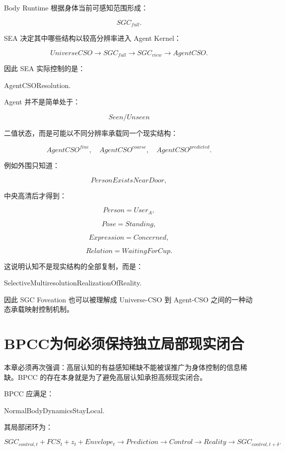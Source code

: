Body Runtime 根据身体当前可感知范围形成：

\[
SGC_{full}.
\]

SEA 决定其中哪些结构以较高分辨率进入 Agent Kernel：

\[
UniverseCSO
\rightarrow
SGC_{full}
\rightarrow
SGC_{view}
\rightarrow
AgentCSO.
\]

因此 SEA 实际控制的是：

\begin{statementbox}
AgentCSOResolution.
\end{statementbox}

Agent 并不是简单处于：

\[
Seen/Unseen
\]

二值状态，而是可能以不同分辨率承载同一个现实结构：

\[
AgentCSO^{fine},
\quad
AgentCSO^{coarse},
\quad
AgentCSO^{predicted}.
\]

例如外围只知道：

\[
PersonExistsNearDoor,
\]

中央高清后才得到：

\[
Person=
User_A,
\]

\[
Pose=Standing,
\]

\[
Expression=Concerned,
\]

\[
Relation=WaitingForCup.
\]

这说明认知不是现实结构的全部复制，而是：

\begin{statementbox}
SelectiveMultiresolutionRealizationOfReality.
\end{statementbox}

因此 SGC Foveation 也可以被理解成 Universe-CSO 到 Agent-CSO 之间的一种动态承载映射控制机制。

\section{BPCC为何必须保持独立局部现实闭合}

本章必须再次强调：高层认知的有益感知稀缺不能被误推广为身体控制的信息稀缺。BPCC 的存在本身就是为了避免高层认知承担高频现实闭合。

BPCC 应满足：

\begin{statementbox}
NormalBodyDynamicsStayLocal.
\end{statementbox}

其局部闭环为：

\[
SGC_{control,t}
+
FCS_t
+
z_t
+
Envelope_t
\rightarrow
Prediction
\rightarrow
Control
\rightarrow
Reality
\rightarrow
SGC_{control,t+\delta}.
\]

